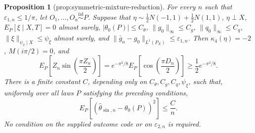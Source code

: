 \documentclass{article}
\newtheorem{proposition}{Proposition}
\begin{document}
\begin{proposition}[prop:symmetric-mixture-reduction]\label{prop:symmetric-mixture-reduction}
For every \(n\) such that \(\varepsilon_{1,n}\le 1/\pi\), let \(O_1,\ldots,O_n\stackrel{\mathrm{iid}}{\sim}P\). Suppose that \(\eta\sim\tfrac12N(-1,1)+\tfrac12N(1,1)\), \(\eta\perp X\), \(E_P[\xi\mid X,T]=0\) almost surely, \(|\theta_0(P)|\le C_{\theta}\), \(\|g_0\|_{\infty}\le C_g\), \(\|q_0\|_{\infty}\le C_q\), \(\|\xi\|_{\psi_2\mid X}\le\psi_{\xi}\) almost surely, and \(\|\bar g_n-g_0\|_{L^1(P_X)}\le\varepsilon_{1,n}\). Then \(\kappa_4(\eta)=-2\), \(M(i\pi/2)=0\), and
\[
E_P\!\left[Z_n\sin\!\left(\frac{\pi Z_n}{2}\right)\right]
=e^{-\pi^2/8}E_P\!\left[\cos\!\left(\frac{\pi D_n}{2}\right)\right]
\ge \frac12e^{-\pi^2/8}.
\]
There is a finite constant \(C\), depending only on \(C_{\theta},C_g,C_q,\psi_{\xi}\), such that, uniformly over all laws \(P\) satisfying the preceding conditions,
\[
E_P\!\left[(\widehat\theta_{\sin,n}-\theta_0(P))^2\right]\le \frac{C}{n}.
\]
No condition on the supplied outcome code or on \(\varepsilon_{2,n}\) is required.
\end{proposition}
\end{document}
